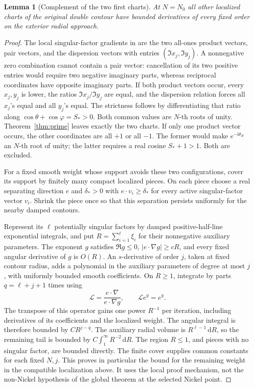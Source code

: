 \documentclass[11pt]{article}
\numberwithin{equation}{section}
\newtheorem{lemma}[theorem]{Lemma}
\theoremstyle{definition}
\newcommand{\dd}{\,\mathrm d}
\newcommand{\ii}{\mathrm i}
\begin{document}
\begin{lemma}[Complement of the two first charts]\label{lem:complement}
At \(N=N_0\) all other localized charts of the original double contour
have bounded derivatives of every fixed order on the exterior radial
approach.
\end{lemma}
\begin{proof}
The local singular-factor gradients in \cite{TW2014} are the two
all-ones product vectors, pair vectors, and the dispersion vectors with
entries \((\Im x_j,\Im y_j)\).
A nonnegative zero combination cannot contain a pair vector:
cancellation of its two positive entries would require two negative
imaginary parts, whereas reciprocal coordinates have opposite imaginary
parts. If both product vectors occur, every \(x_j,y_j\) is lower,
the ratios \(\Im x_j/\Im y_j\) are equal, and the dispersion relation
forces all \(x_j\)'s equal and all \(y_j\)'s equal. The strictness follows
by differentiating that ratio along
\(\cos\theta+\cos\varphi=S_*>0\). Both common values are \(N\)-th
roots of unity. Theorem~\ref{thm:prime} leaves exactly the two charts.
If only one product vector occurs, the other coordinates are all \(+1\)
or all \(-1\). The former would make \(e^{-\ii\theta_B}\) an \(N\)-th
root of unity; the latter requires a real cosine \(S_*+1>1\).
Both are excluded.

For a fixed smooth weight whose support avoids these two
configurations, cover its support by finitely many compact localized
pieces. On each piece choose a real separating direction \(e\) and
\(\delta_*>0\) with \(e\cdot v_i\ge\delta_*\) for every active
singular-factor vector \(v_i\). Shrink the piece once so that this
separation persists uniformly for the nearby damped contours.

Represent its \(\ell\) potentially singular factors by damped
positive-half-line exponential integrals, and put
\(R=\sum_{i=1}^{\ell}\xi_i\) for their nonnegative auxiliary
parameters. The exponent \(g\) satisfies \(\Re g\le0\),
\(|e\cdot\nabla g|\ge cR\), and every fixed angular derivative
of \(g\) is \(O(R)\). An \(s\)-derivative of order \(j\), taken
at fixed contour radius, adds a polynomial in the auxiliary parameters
of degree at most \(j\), with uniformly bounded smooth coefficients.
On \(R\ge1\), integrate by parts \(q=\ell+j+1\) times using
\[
 \mathcal L=\frac{e\cdot\nabla}{e\cdot\nabla g},
 \qquad \mathcal L e^g=e^g.
\]
The transpose of this operator gains one power \(R^{-1}\) per
iteration, including derivatives of its coefficients and the localized
weight. The angular integral is therefore bounded by \(CR^{j-q}\).
The auxiliary radial volume is \(R^{\ell-1}\dd R\), so the
remaining tail is bounded by \(C\int_1^\infty R^{-2}\dd R\).
The region \(R\le1\), and pieces with no singular factor, are bounded
directly. The finite cover supplies common constants for each fixed
\(N,j\). This proves in particular the bound for the remaining
weight in the compatible localization above. It uses the local proof
mechanism, not the non-Nickel hypothesis of the global theorem at
the selected Nickel point.
\end{proof}
\end{document}
